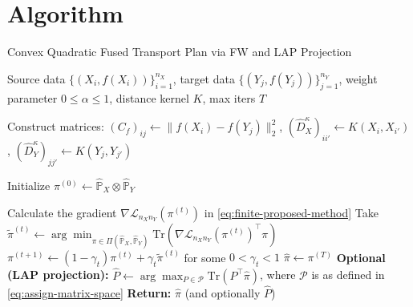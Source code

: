 \documentclass{article}
\begin{document}
\section{Algorithm}
\begin{algorithm}[t]
	\caption{Convex Quadratic Fused Transport Plan via FW and LAP Projection}
	\label{alg:proposed-algorithm}
	\begin{algorithmic}[1]
		\Require Source data $\{(X_i, f(X_i))\}_{i=1}^{n_X}$, target data $\{(Y_j, f(Y_j))\}_{j=1}^{n_Y}$, weight parameter $0 \leq \alpha \leq 1$, distance kernel $K$, max iters $T$
		
		\State Construct matrices:
		\Statex \hspace{\algorithmicindent} $(C_f)_{ij} \gets \|f(X_i)-f(Y_j)\|_2^2$, \quad
		$(\hat{D}_X^{\kappa})_{ii'} \gets K(X_i,X_{i'})$, \quad
		$(\hat{D}_Y^{\kappa})_{jj'} \gets K(Y_j,Y_{j'})$
		
		\State Initialize $\pi^{(0)} \gets \hat{\mathbb{P}}_X \otimes \hat{\mathbb{P}}_Y$
		
		\State Calculate the gradient $\nabla \mathcal{L}_{n_Xn_Y}(\pi^{(t)})$ in \eqref{eq:finite-proposed-method}
		\State Take $\tilde{\pi}^{(t)} \gets \arg\min_{\pi \in \Pi(\hat{\mathbb{P}}_X,\hat{\mathbb{P}}_Y)} \mathrm{Tr}(\nabla \mathcal{L}_{n_Xn_Y}(\pi^{(t)})^\top \pi)$
		\State $\pi^{(t+1)} \gets (1-\gamma_t)\pi^{(t)} + \gamma_t \tilde{\pi}^{(t)}$ for some $0 < \gamma_t < 1$
		\EndFor
		\State $\hat\pi \gets \pi^{(T)}$
		\State \textbf{Optional (LAP projection):} $\displaystyle
		\hat P \gets \arg\max_{P \in \mathcal{P}} \mathrm{Tr}(P^\top \hat\pi)$, where $\mathcal{P}$ is as defined in \eqref{eq:assign-matrix-space}
		\State \textbf{Return:} $\hat\pi$ (and optionally $\hat P$)
	\end{algorithmic}
\end{algorithm}
\end{document}
